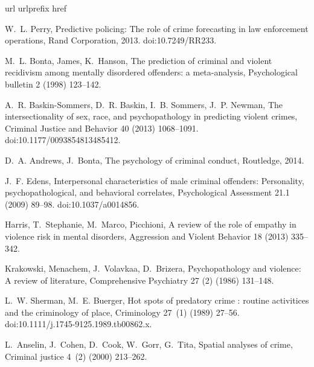 \documentclass[review]{elsarticle}
\begin{document}
% 
\begin{thebibliography}{10}
\expandafter\ifx\csname url\endcsname\relax
  \def\url#1{\texttt{#1}}\fi
\expandafter\ifx\csname urlprefix\endcsname\relax\def\urlprefix{URL }\fi
\expandafter\ifx\csname href\endcsname\relax
  \def\href#1#2{#2} \def\path#1{#1}\fi

W.~L. Perry, Predictive policing: The role of crime forecasting in law
  enforcement operations, Rand Corporation, 2013.
\newblock \href {http://dx.doi.org/10.7249/RR233} {\path{doi:10.7249/RR233}}.

M.~L. Bonta, James, K.~Hanson, The prediction of criminal and violent
  recidivism among mentally disordered offenders: a meta-analysis,
  Psychological bulletin 2 (1998) 123--142.

A.~R. Baskin-Sommers, D.~R. Baskin, I.~B. Sommers, J.~P. Newman, The
  intersectionality of sex, race, and psychopathology in predicting violent
  crimes, Criminal Justice and Behavior 40 (2013) 1068--1091.
\newblock \href {http://dx.doi.org/10.1177/0093854813485412}
  {\path{doi:10.1177/0093854813485412}}.

D.~A. Andrews, J.~Bonta, The psychology of criminal conduct, Routledge, 2014.

J.~F. Edens, Interpersonal characteristics of male criminal offenders:
  Personality, psychopathological, and behavioral correlates, Psychological
  Assessment 21.1 (2009) 89--98.
\newblock \href {http://dx.doi.org/10.1037/a0014856}
  {\path{doi:10.1037/a0014856}}.

Harris, T.~Stephanie, M.~Marco, Picchioni, A review of the role of empathy in
  violence risk in mental disorders, Aggression and Violent Behavior 18 (2013)
  335--342.

Krakowski, Menachem, J.~Volavkaa, D.~Brizera, Psychopathology and violence: A
  review of literature, Comprehensive Psychiatry 27 (2) (1986) 131--148.

L.~W. Sherman, M.~E. Buerger, Hot spots of predatory crime : routine
  activitices and the criminology of place, Criminology 27~(1) (1989) 27--56.
\newblock \href {http://dx.doi.org/10.1111/j.1745-9125.1989.tb00862.x}
  {\path{doi:10.1111/j.1745-9125.1989.tb00862.x}}.

L.~Anselin, J.~Cohen, D.~Cook, W.~Gorr, G.~Tita, Spatial analyses of crime,
  Criminal justice 4~(2) (2000) 213--262.


\end{thebibliography}
\end{document}
